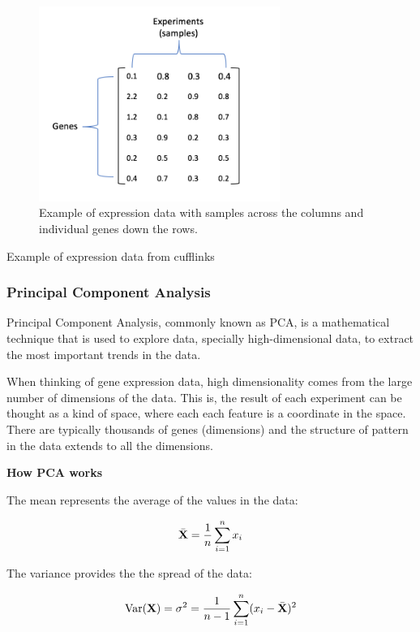 \documentclass[11pt, oneside]{article}   	%
\begin{document}
\begin{figure}[!h]
	\centering
	\includegraphics[width=0.7\textwidth]{example_expression_data}
	\caption{Example of expression data with samples across the columns and individual genes down the rows.}
	\label{fig:ExpressionData}
\end{figure}


Example of expression data from cufflinks 



\subsubsection{Principal Component Analysis}

Principal Component Analysis, commonly known as PCA, is a mathematical technique that is used to explore data, specially high-dimensional data, to extract the most important trends in the data.

When thinking of gene expression data, high dimensionality comes from the large number of dimensions of the data. This is, the result of each experiment can be thought as a kind of space, where each each feature is a coordinate in the space. There are typically thousands of genes (dimensions) and the structure of pattern in the data extends to all the dimensions. 


{\bf How PCA works}

The mean represents the average of the values in the data:

\begin{equation}
   \bar{{\bf X}} = \frac{1}{n} \sum_{i=1}^{n} x_i 
\end{equation}

The variance provides the the spread of the data:

\begin{equation}
   \text{Var} ({\bf X}) = \sigma^2  = \frac{1}{n-1} \sum_{i=1}^{n} ( x_i -  \bar{{\bf X}})^2
\end{equation}
\end{document}
